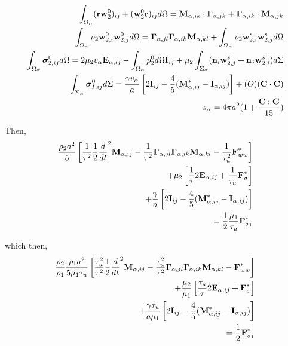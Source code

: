 \begin{align}
    \int_{\Omega_\alpha} (\textbf{rw}_ 2^0 )_{ij}+ (\textbf{w}_2^0 \textbf{r})_{ij} d\Omega 
    = \textbf{M}_{\alpha,ik} \cdot \bm\Gamma_{\alpha,jk}
        +  \bm\Gamma_{\alpha,ik} \cdot \textbf{M}_{\alpha,jk}
    \\
    \int_{\Omega_\alpha} \rho_2 \textbf{w}_{2,i}^0\textbf{w}_{2,j}^0 d\Omega
    = \bm\Gamma_{\alpha,jl}\bm\Gamma_{\alpha,ik} \textbf{M}_{\alpha,kl}  
        +\int_{\Omega_\alpha} \rho_2 \textbf{w}_{2,i}^s\textbf{w}_{2,j}^s d\Omega
    \\
    \int_{\Omega_\alpha} \bm\sigma_{2,ij}^0 d\Omega
    =
    2 \mu_2 v_\alpha \textbf{E}_{\alpha,ij}
    - \int_{\Omega_\alpha} p_2^0 d\Omega \textbf{I}_{ij}
    + \mu_2 \int_{\Sigma_\alpha} (\textbf{n}_i \textbf{w}_{2,j}^s + \textbf{n}_j \textbf{w}_{2,i}^s) d\Sigma
    \\
    \int_{\Sigma_\alpha} \bm\sigma_{I,ij}^0 d\Sigma
    = \frac{\gamma v_\alpha }{a} \left[
        2\textbf{I}_{ij} 
        - \frac{4  }{5} (\textbf{M}_{\alpha,ij}^* - \textbf{I}_{\alpha,ij})
    \right]
    +\mathcal(O)(\textbf{C}\cdot \textbf{C})\\
    s_\alpha 
    = 4\pi a^2 (1+\frac{\textbf{C}:\textbf{C}}{15})
\end{align}

Then, 
\begin{align*}
    \frac{\rho_2 a^2}{5}\left[
        \frac{1}{\tau^2}\frac{1}{2}\frac{d}{d t}^2 \textbf{M}_{\alpha,ij}
    -   \frac{1}{\tau^2}\bm\Gamma_{\alpha,jl}\bm\Gamma_{\alpha,ik} \textbf{M}_{\alpha,kl}  
    - \frac{1}{\tau_u^2} \textbf{F}_{ww}^*
    \right]\\
    + \mu_2  \left[
        \frac{1}{\tau} 2\textbf{E}_{\alpha,ij}
    + \frac{1}{\tau_u} \textbf{F}_\sigma^*
    \right]\\
    + \frac{\gamma  }{a} \left[
    2\textbf{I}_{ij} 
    - \frac{4  }{5} (\textbf{M}_{\alpha,ij}^* - \textbf{I}_{\alpha,ij})
    \right]\\
    = 
    \frac{1}{2}
    \frac{ \mu_1}{\tau_u} 
    \textbf{F}_{\sigma_1}^*
\end{align*}

which then, 
\begin{align*}
    \frac{\rho_2}{\rho_1}\frac{\rho_1 a^2}{5\mu_1\tau_u}\left[
        \frac{\tau_u^2}{\tau^2}\frac{1}{2}\frac{d}{d t}^2 \textbf{M}_{\alpha,ij}
    -   \frac{\tau_u^2}{\tau^2}\bm\Gamma_{\alpha,jl}\bm\Gamma_{\alpha,ik} \textbf{M}_{\alpha,kl}  
    - \textbf{F}_{ww}^*
    \right]\\
    + \frac{\mu_2}{\mu_1}  \left[
        \frac{\tau_u}{\tau} 2\textbf{E}_{\alpha,ij}
    +  \textbf{F}_\sigma^*
    \right]\\
    + \frac{\gamma \tau_u }{a\mu_1} \left[
    2\textbf{I}_{ij} 
    - \frac{4  }{5} (\textbf{M}_{\alpha,ij}^* - \textbf{I}_{\alpha,ij})
    \right]\\
    = 
    \frac{1}{2}
    \textbf{F}_{\sigma_1}^*
\end{align*}

